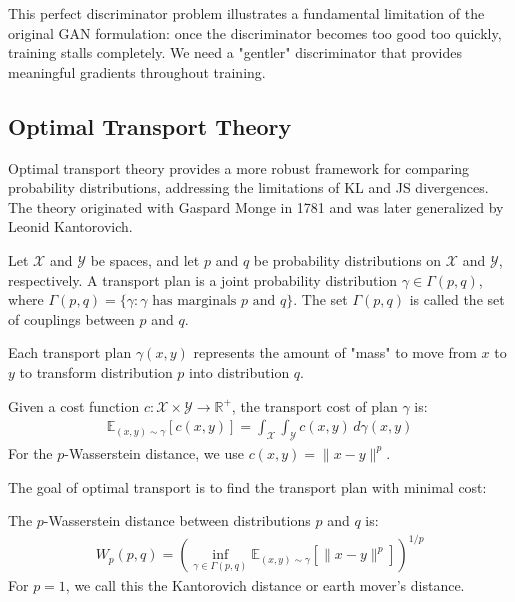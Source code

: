 This perfect discriminator problem illustrates a fundamental limitation of the original GAN formulation: once the discriminator becomes too good too quickly, training stalls completely. We need a "gentler" discriminator that provides meaningful gradients throughout training.

\subsection{Optimal Transport Theory}

Optimal transport theory provides a more robust framework for comparing probability distributions, addressing the limitations of KL and JS divergences. The theory originated with Gaspard Monge in 1781 and was later generalized by Leonid Kantorovich.

\begin{definition}%
  \label{def:transport-plan}
  Let $\mathcal{X}$ and $\mathcal{Y}$ be spaces, and let $p$ and $q$ be probability distributions on $\mathcal{X}$ and $\mathcal{Y}$, respectively. A \textnormal{\sffamily transport plan} is a joint probability distribution $\gamma \in \Gamma(p, q)$, where $\Gamma(p, q) = \{\gamma : \gamma \text{ has marginals } p \text{ and } q\}$. The set $\Gamma(p, q)$ is called the \textnormal{\sffamily set of couplings} between $p$ and $q$.
\end{definition}

\begin{remark}
  Each transport plan $\gamma(x, y)$ represents the amount of "mass" to move from $x$ to $y$ to transform distribution $p$ into distribution $q$.
\end{remark}

\begin{definition}%
  \label{def:transport-cost}
  Given a cost function $c: \mathcal{X} \times \mathcal{Y} \to \mathbb{R}^+$, the \textnormal{\sffamily transport cost} of plan $\gamma$ is:
  \begin{align}
    \mathbb{E}_{(x,y) \sim \gamma}[c(x, y)] = \int_{\mathcal{X}} \int_{\mathcal{Y}} c(x, y) \, d\gamma(x, y)
  \end{align}
  For the $p$-Wasserstein distance, we use $c(x, y) = \|x - y\|^p$.
\end{definition}

The goal of optimal transport is to find the transport plan with minimal cost:

\begin{definition}%
  \label{def:wasserstein}
  The \textnormal{\sffamily $p$-Wasserstein distance} between distributions $p$ and $q$ is:
  \begin{align}
    W_p(p, q) = \left( \inf_{\gamma \in \Gamma(p, q)} \mathbb{E}_{(x,y) \sim \gamma}[\|x - y\|^p] \right)^{1/p}
  \end{align}
  For $p = 1$, we call this the \textnormal{\sffamily Kantorovich distance} or \textnormal{\textsf earth mover's distance}.
\end{definition}

